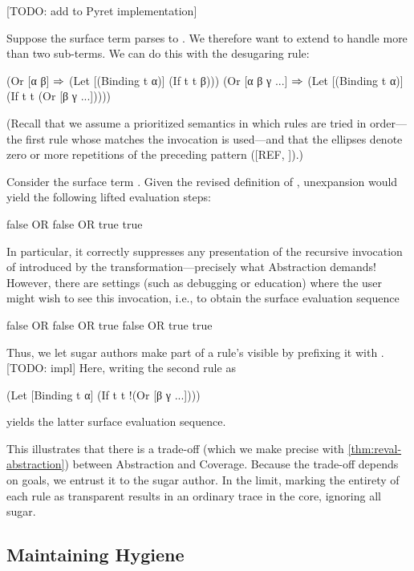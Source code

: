 [TODO: add to Pyret implementation]

Suppose the surface term  parses to
. We therefore want to extend 
to handle more than two sub-terms.  We can do this with the desugaring
rule:
\begin{Codes}
(Or [α β] \(\Rightarrow\)
  (Let [(Binding t α)]
      (If t t β)))
(Or [α β γ ...] \(\Rightarrow\)
  (Let [(Binding t α)]
      (If t t (Or [β γ ...]))))
\end{Codes}
(Recall that we assume a prioritized semantics in which rules are tried in
order---the first rule whose  matches the invocation is
used---and that the ellipses denote zero or more repetitions
of the preceding pattern ([REF, \cite{macro-by-example}]).)

Consider the surface term . 
Given the revised definition of , unexpansion would yield the
following lifted evaluation steps:
\begin{Codes}
    false OR false OR true
\SurfStep true
\end{Codes}
In particular, it correctly suppresses any presentation of the recursive
invocation of 
introduced by the transformation---precisely what Abstraction demands!
However, there are settings
(such as debugging or education) where the user might wish to see this
invocation, i.e., to obtain the surface evaluation sequence
\begin{Codes}
    false OR false OR true
\SurfStep false OR true
\SurfStep true
\end{Codes}
Thus, we let sugar authors make part of a rule's 
visible by prefixing it with \Code{!}. [TODO: impl] Here, writing the second
 rule as
\begin{Codes}
(Let [Binding t α]
    (If t t !(Or [β γ ...])))
\end{Codes}
yields the latter surface evaluation sequence.

This illustrates that there is a trade-off (which we make precise with
\cref{thm:reval-abstraction}) between Abstraction and Coverage.
Because the trade-off depends on
goals, we entrust it to the sugar author.  In the limit,
marking the entirety of each rule as transparent results in
an ordinary trace in the core, ignoring all sugar.

\subsection{Maintaining Hygiene}

